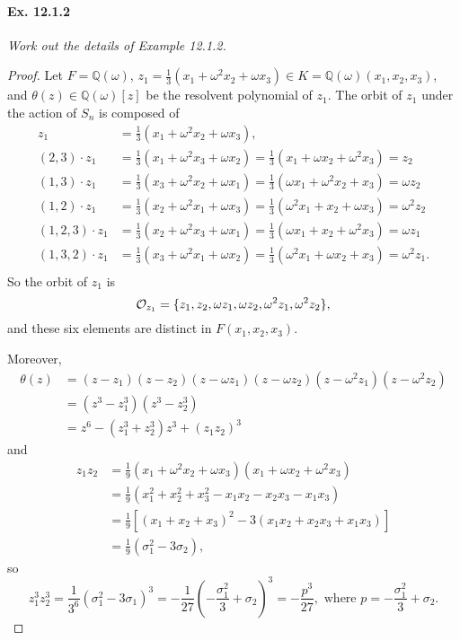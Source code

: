 \documentclass[11pt,a4paper]{article}
\newcommand{\Q}{\mathbb{Q}}
\begin{document}
\paragraph{Ex. 12.1.2}

{\it Work out the details of Example 12.1.2.
}

\begin{proof}
Let $F = \Q(\omega)$, $z_1 = \frac{1}{3}(x_1+\omega^2 x_2+\omega x_3) \in K=\Q(\omega)(x_1,x_2,x_3)$,  and $\theta(z) \in \Q(\omega)[z]$ be the resolvent polynomial of $z_1$.
The orbit of $z_1$ under the action of $S_n$ is composed of 
\begin{align*}
z_1& =\frac{1}{3}(x_1+\omega^2 x_2+\omega x_3),\\
  (2,3)\cdot z_1 &= \frac{1}{3}(x_1+\omega^2 x_3+\omega x_2) = \frac{1}{3}(x_1+\omega x_2+\omega^2 x_3)=z_2\\
  (1,3) \cdot z_1 &=\frac{1}{3}(x_3+\omega^2 x_2+\omega x_1) =  \frac{1}{3}(\omega x_1+\omega^2 x_2+ x_3) = \omega z_2\\
  (1,2) \cdot z_1 &=\frac{1}{3}(x_2+\omega^2 x_1+\omega x_3) =  \frac{1}{3}(\omega^2 x_1+ x_2+ \omega x_3) = \omega^2 z_2\\
 (1,2,3)\cdot z_1 &= \frac{1}{3}(x_2+\omega^2 x_3+\omega x_1) =  \frac{1}{3}(\omega x_1+ x_2+\omega^2 x_3) = \omega z_1\\
 (1,3,2)\cdot z_1 &= \frac{1}{3}(x_3+\omega^2 x_1+\omega x_2) =  \frac{1}{3}(\omega^2 x_1+ \omega x_2+ x_3) = \omega^2 z_1.\\
\end{align*}
So the orbit of $z_1$ is
$${\cal O}_{z_1} = \{z_1,z_2,\omega z_1,\omega z_2,\omega^2 z_1,\omega^2 z_2\},$$
and these six elements are distinct in $F(x_1,x_2,x_3)$.

Moreover,
\begin{align*}
\theta(z) &= (z-z_1)(z-z_2)(z-\omega z_1)(z-\omega z_2) (z- \omega^2 z_1)(z-\omega^2 z_2)\\
&=(z^3-z_1^3)(z^3 - z_2^3)\\
&=z^6 - (z_1^3+z_2^3)z^3 +(z_1z_2)^3
\end{align*}
and 
\begin{align*}
z_1z_2 &= \frac{1}{9}(x_1+\omega^2 x_2+\omega x_3)(x_1+\omega x_2+\omega^2 x_3)\\
&= \frac{1}{9}(x_1^2+x_2^2+x_3^2-x_1x_2-x_2x_3-x_1x_3)\\
&= \frac{1}{9}[(x_1+x_2+x_3)^2 - 3(x_1x_2+x_2x_3+x_1x_3)]\\
&=\frac{1}{9}(\sigma_1^2 - 3 \sigma_2),
\end{align*}
so 
$$z_1^3z_2^3 = \frac{1}{3^6}(\sigma_1^2-3\sigma_1)^3 = -\frac{1}{27}\left(-\frac{\sigma_1^2}{3} + \sigma_2 \right)^3 = -\frac{p^3}{27},\text{ where } p = -\frac{\sigma_1^2}{3} + \sigma_2.$$


\end{proof}
\end{document}
